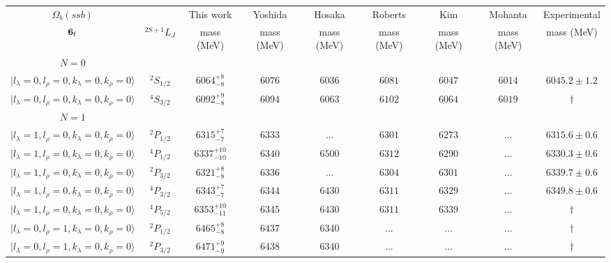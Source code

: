 \begin{tabular}{c c| c c c c c c c}\hline \hline
$\Omega_{b}(ssb)$&                  & This work   &   Yoshida     &  Hosaka      &  Roberts    & Kim        & Mohanta    & Experimental  \\ 
${\bf {6}}_{\rm f}$  & $^{2S+1}L_{J}$ & mass (MeV)  &   mass (MeV)  &  mass (MeV)  &  mass (MeV) & mass (MeV) & mass (MeV) &      mass (MeV) \\ \hline
\hline
 $N=0$  &  &  &  &  &  \\ 
$\vert l_{\lambda}\!\!=\!0, l_{\rho}\!\!=\!0, k_{\lambda}\!\!=\!0, k_{\rho}\!\!=\!0 \rangle$ & $^{2}S_{1/2}$ & $6064^{+8}_{-8}$ & $6076$ & $6036$ & $6081$ & $6047$ & $6014$ & $6045.2\pm 1.2$ \\ 
$\vert l_{\lambda}\!\!=\!0, l_{\rho}\!\!=\!0, k_{\lambda}\!\!=\!0, k_{\rho}\!\!=\!0 \rangle$ & $^{4}S_{3/2}$ & $6092^{+9}_{-8}$ & $6094$ & $6063$ & $6102$ & $6064$ & $6019$ & $\dagger$ \\ 
\hline
 $N=1$  &  &  &  &  &  \\ 
$\vert l_{\lambda}\!\!=\!1, l_{\rho}\!\!=\!0, k_{\lambda}\!\!=\!0, k_{\rho}\!\!=\!0 \rangle$ & $^{2}P_{1/2}$ & $6315^{+7}_{-7}$ & $6333$ & ... & $6301$ & $6273$ & ... & $6315.6\pm 0.6$ \\ 
$\vert l_{\lambda}\!\!=\!1, l_{\rho}\!\!=\!0, k_{\lambda}\!\!=\!0, k_{\rho}\!\!=\!0 \rangle$ & $^{4}P_{1/2}$ & $6337^{+10}_{-10}$ & $6340$ & $6500$ & $6312$ & $6290$ & ... & $6330.3\pm 0.6$ \\ 
$\vert l_{\lambda}\!\!=\!1, l_{\rho}\!\!=\!0, k_{\lambda}\!\!=\!0, k_{\rho}\!\!=\!0 \rangle$ & $^{2}P_{3/2}$ & $6321^{+8}_{-8}$ & $6336$ & ... & $6304$ & $6301$ & ... & $6339.7\pm 0.6$ \\ 
$\vert l_{\lambda}\!\!=\!1, l_{\rho}\!\!=\!0, k_{\lambda}\!\!=\!0, k_{\rho}\!\!=\!0 \rangle$ & $^{4}P_{3/2}$ & $6343^{+7}_{-7}$ & $6344$ & $6430$ & $6311$ & $6329$ & ... & $6349.8\pm 0.6$ \\ 
$\vert l_{\lambda}\!\!=\!1, l_{\rho}\!\!=\!0, k_{\lambda}\!\!=\!0, k_{\rho}\!\!=\!0 \rangle$ & $^{4}P_{5/2}$ & $6353^{+10}_{-11}$ & $6345$ & $6430$ & $6311$ & $6339$ & ... & $\dagger$ \\ 
$\vert l_{\lambda}\!\!=\!0, l_{\rho}\!\!=\!1, k_{\lambda}\!\!=\!0, k_{\rho}\!\!=\!0 \rangle$ & $^{2}P_{1/2}$ & $6465^{+8}_{-8}$ & $6437$ & $6340$ & ... & ... & ... & $\dagger$ \\ 
$\vert l_{\lambda}\!\!=\!0, l_{\rho}\!\!=\!1, k_{\lambda}\!\!=\!0, k_{\rho}\!\!=\!0 \rangle$ & $^{2}P_{3/2}$ & $6471^{+9}_{-9}$ & $6438$ & $6340$ & ... & ... & ... & $\dagger$ \\ 

\end{tabular}
